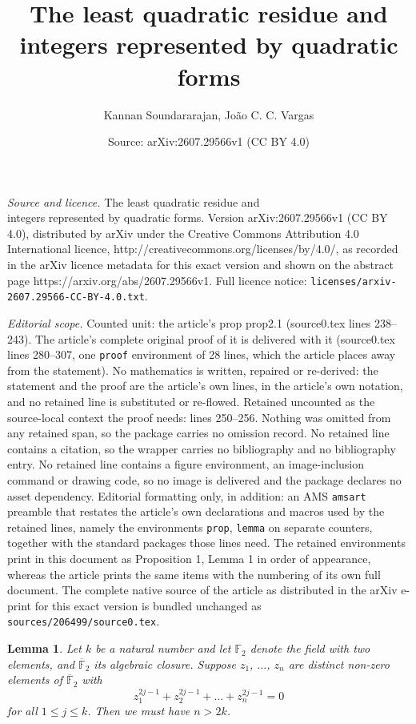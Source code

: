 \documentclass[10pt,a4paper]{amsart}
\title{The least quadratic residue and \\ integers represented by quadratic forms}
\author{Kannan Soundararajan, Jo\~ao C. C. Vargas}
\date{Source: arXiv:2607.29566v1 (CC BY 4.0)}
\newtheorem{lemma}{Lemma}
\begin{document}
\maketitle

\noindent\emph{Source and licence.} The least quadratic residue and \\ integers represented by quadratic forms. Version arXiv:2607.29566v1 (CC BY 4.0), distributed by arXiv under the Creative Commons Attribution 4.0 International licence, http://creativecommons.org/licenses/by/4.0/, as recorded in the arXiv licence metadata for this exact version and shown on the abstract page https://arxiv.org/abs/2607.29566v1. Full licence notice: \texttt{licenses/arxiv-2607.29566-CC-BY-4.0.txt}.\par\smallskip

\noindent\textit{Editorial scope.} Counted unit: the article's prop prop2.1 (source0.tex lines 238--243). The article's complete original proof of it is delivered with it (source0.tex lines 280--307, one \texttt{proof} environment of 28 lines, which the article places away from the statement). No mathematics is written, repaired or re-derived: the statement and the proof are the article's own lines, in the article's own notation, and no retained line is substituted or re-flowed.  Retained uncounted as the source-local context the proof needs: lines 250--256.  Nothing was omitted from any retained span, so the package carries no omission record.  No retained line contains a citation, so the wrapper carries no bibliography and no bibliography entry.  No retained line contains a figure environment, an image-inclusion command or drawing code, so no image is delivered and the package declares no asset dependency.  Editorial formatting only, in addition: an AMS \texttt{amsart} preamble that restates the article's own declarations and macros used by the retained lines, namely the environments \texttt{prop}, \texttt{lemma} on separate counters, together with the standard packages those lines need.  The retained environments print in this document as Proposition 1, Lemma 1 in order of appearance, whereas the article prints the same items with the numbering of its own full document.  The complete native source of the article as distributed in the arXiv e-print for this exact version is bundled unchanged as \texttt{sources/206499/source0.tex}.
\begin{lemma}\label{newtonsIdent} 
    Let $k$ be a natural number and let ${\mathbb F}_2$ denote the field with two elements, and $\overline{\mathbb F}_2$ its algebraic closure.  Suppose $z_1$, $\ldots$, $z_n$ are distinct non-zero elements of $\overline{{\mathbb F}}_2$ with 
    $$ 
    z_1^{2j-1} + z_2^{2j-1} + \ldots + z_n^{2j-1} =0
    $$
    for all $1\le j\le k$.   Then we must have $n> 2k$.  
\end{lemma}
\end{document}
